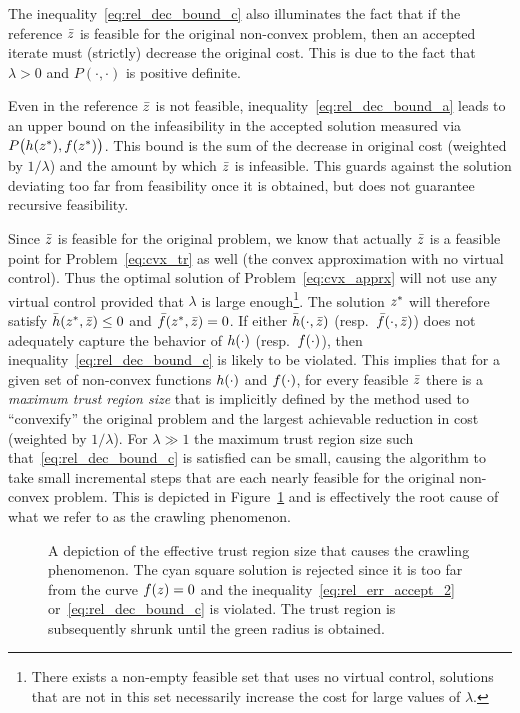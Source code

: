 \documentclass[letterpaper, 10 pt, conference]{ieeeconf}
\begin{document}
\begin{remark}
The inequality~\eqref{eq:rel_dec_bound_c} also illuminates the fact that if the reference $\bar{z}$ is feasible for the original non-convex problem, then an accepted iterate must (strictly) decrease the original cost. This is due to the fact that $\lambda>0$ and $P(\cdot,\cdot)$ is positive definite.
\end{remark}
%
\begin{remark}
Even in the reference $\bar{z}$ is not feasible, inequality~\eqref{eq:rel_dec_bound_a} leads to an upper bound on the infeasibility in the accepted solution measured via $P\big(h(z^*),f(z^*)\big)$. This bound is the sum of the decrease in original cost (weighted by $1/\lambda$) and the amount by which $\bar{z}$ is infeasible. This guards against the solution deviating too far from feasibility once it is obtained, but does not guarantee recursive feasibility. 
\end{remark}

Since $\bar{z}$ is feasible for the original problem, we know that actually $\bar{z}$ is a feasible point for Problem~\eqref{eq:cvx_tr} as well (the convex approximation with no virtual control). Thus the optimal solution of Problem~\eqref{eq:cvx_apprx} will not use any virtual control provided that $\lambda$ is large enough\footnote{There exists a non-empty feasible set that uses no virtual control, solutions that are not in this set necessarily increase the cost for large values of $\lambda$.}. The solution $z^*$ will therefore satisfy $\bar{h}(z^*,\bar{z})\leq 0$ and $\bar{f}(z^*,\bar{z})=0$. If either $\bar{h}(\cdot,\bar{z})$ (resp.~$\bar{f}(\cdot,\bar{z})$) does not adequately capture the behavior of $h(\cdot)$ (resp.~$f(\cdot)$), then inequality~\eqref{eq:rel_dec_bound_c} is likely to be violated. This implies that for a given set of non-convex functions $h(\cdot)$ and $f(\cdot)$, for every feasible $\bar{z}$ there is a \textit{maximum trust region size} that is implicitly defined by the method used to ``convexify'' the original problem and the largest achievable reduction in cost (weighted by $1/\lambda$). For $\lambda\gg1$ the maximum trust region size such that~\eqref{eq:rel_dec_bound_c} is satisfied can be small, causing the algorithm to take small incremental steps that are each nearly feasible for the original non-convex problem. This is depicted in Figure~\ref{fig:effective_tr} and is effectively the root cause of what we refer to as the crawling phenomenon.

\begin{figure}
\centering

\caption{A depiction of the effective trust region size that causes the crawling phenomenon. The cyan square solution is rejected since it is too far from the curve $f(z)=0$ and the inequality~\eqref{eq:rel_err_accept_2} or~\eqref{eq:rel_dec_bound_c} is violated. The trust region is subsequently shrunk until the green radius is obtained.}
\label{fig:effective_tr}
\end{figure}
\end{document}
